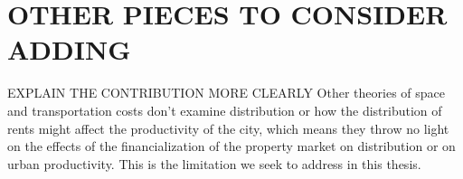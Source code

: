 













\section{OTHER PIECES TO CONSIDER ADDING}
EXPLAIN THE CONTRIBUTION MORE CLEARLY
Other theories of space and transportation costs  don't examine distribution or how the distribution of rents might affect the productivity of the city, which means they throw no light on the effects of the financialization of the property market on distribution or on urban productivity.  This is the limitation we seek to address in this thesis. 

